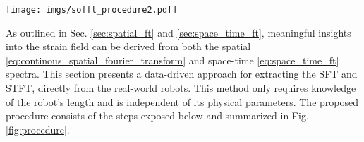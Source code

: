 %     
\begin{figure*}
    \centering
    \texttt{[image: imgs/sofft\_procedure2.pdf]}
    \caption{Illustration of the proposed data-driven methodology. The robot is subjected to the standard signals and the samples of the strain field are measured by the sensors. Through \ac{FFT}, the space-time spectrum can be computed.}
    \label{fig:procedure}
\end{figure*}
%
As outlined in Sec. \ref{sec:spatial_ft} and \ref{sec:space_time_ft}, meaningful insights into the strain field can be derived from both the spatial \eqref{eq:continous_spatial_fourier_transform} and space-time \eqref{eq:space_time_ft} spectra.
This section presents a data-driven approach for extracting the \ac{SFT} and \ac{STFT}, directly from the real-world robots. 
This method only requires knowledge of the robot's length and is independent of its physical parameters.
The proposed procedure consists of the steps exposed below and summarized in Fig. \ref{fig:procedure}.
